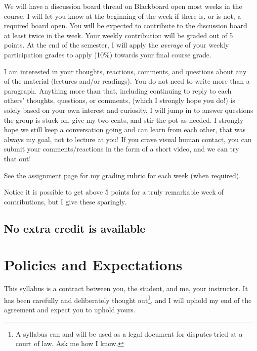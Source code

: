 \documentclass{article}
\begin{document}
We will have a discussion board thread on Blackboard open most weeks in
the course. I will let you know at the beginning of the week if there
is, or is not, a required board open. You will be expected to contribute
to the discussion board at least twice in the week. Your weekly
contribution will be graded out of 5 points. At the end of the semester,
I will apply the \emph{average} of your weekly participation grades to
apply (10\%) towards your final course grade.

I am interested in your thoughts, reactions, comments, and questions
about any of the material (lectures and/or readings). You do not need to
write more than a paragraph. Anything more than that, including
continuing to reply to each others' thoughts, questions, or comments,
(which I strongly hope you do!) is solely based on your own interest and
curiosity. I will jump in to answer questions the group is stuck on,
give my two cents, and stir the pot as needed. I strongly hope we still
keep a conversation going and can learn from each other, that was always
my goal, not to lecture at you! If you crave visual human contact, you
can submit your comments/reactions in the form of a short video, and we
can try that out!

See the \href{/assignments/}{assignment page} for my grading rubric for
each week (when required).

Notice it is possible to get above 5 points for a truly remarkable week
of contributions, but I give these sparingly.

\hypertarget{no-extra-credit-is-available}{%
\subsection*{No extra credit is
available}\label{no-extra-credit-is-available}}

\hypertarget{policies-and-expectations}{%
\section*{Policies and Expectations}\label{policies-and-expectations}}

This syllabus is a contract between you, the student, and me, your
instructor. It has been carefully and deliberately thought
out\footnote{A syllabus can and will be used as a legal document for
  disputes tried at a court of law. Ask me how I know.}, and I will
uphold my end of the agreement and expect you to uphold yours.
\end{document}
